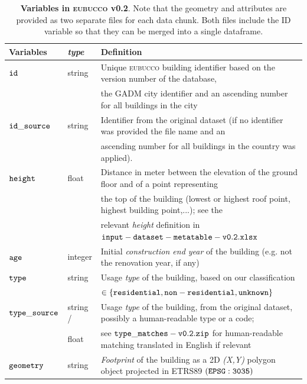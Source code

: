 \documentclass[fleqn,10pt]{wlscirep}
\begin{document}
\begin{table}[h!]
\centering
\renewcommand{\arraystretch}{1.4}
\begin{tabular}{lll}
\hline
\textbf{Variables} & \textbf{\textit{type}} & \textbf{Definition} \\
\hline
${\tt id}$ & string & Unique \textsc{eubucco} building identifier based on the version number of the database, 
\\ & & the GADM city identifier and an ascending number for all buildings in the city \\

${\tt id\_source}$ & string & Identifier from the original dataset (if no identifier was provided the file name and an 
\\ & & ascending number for all buildings in the country was applied). \\

${\tt height}$ & float & Distance in meter between the elevation of the ground floor and of a point representing \\
& & the top of the building (lowest or highest roof point, highest building point,...); see the \\
& & relevant \textit{height} definition in ${\tt input-dataset-metatable-v0.2.xlsx}$ \\

$\tt{age}$ & integer &  Initial \textit{construction end year} of the building (e.g. not the renovation year, if any) \\

$\tt{type}$ & string & Usage \textit{type} of the building, based on our classification \\
&& $ \in \{\tt{residential},\tt{non-residential},\tt{unknown}\} $ \\

${\tt type\_source}$ & string / & Usage \textit{type} of the building, from the original dataset, possibly a human-readable type or a code; \\
& float & see ${\tt type\_matches-v0.2.zip}$ for human-readable matching translated in English if relevant \\

${\tt geometry}$ & string & \textit{Footprint} of the building as a 2D \textit{(X,Y)} polygon object projected in ETRS89
$(\tt{EPSG:3035})$ \\
\hline
\end{tabular}
\caption{\label{tab:variables}\textbf{Variables in \textsc{eubucco} v0.2}. Note that the geometry and attributes are provided as two separate files for each data chunk. Both files include the ID variable so that they can be merged into a single dataframe.}
\end{table}
\end{document}
